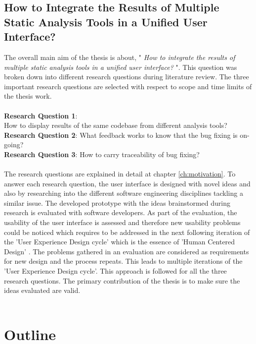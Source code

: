 \subsection{How to Integrate the Results of Multiple Static Analysis Tools in a Unified User Interface?}

The overall main aim of the thesis is about, " \textit{How to integrate the results of multiple static analysis tools in a unified user interface?} ". This question was broken down into different research questions during literature review. The three important research questions are selected with respect to scope and time limits of the thesis work. \\ \\

\noindent\textbf{Research Question 1}: \\ How to display results of the same codebase from different analysis tools? \\
\textbf{Research Question 2}: What feedback works to know that the bug fixing is on-going? \\
\textbf{Research Question 3}: How to carry traceability of bug fixing? \\ \\

The research questions are explained in detail at chapter \ref{ch:motivation}. To answer each research question, the user interface is designed with novel ideas and also by researching into  the different software engineering disciplines tackling a similar issue. The developed prototype with the ideas brainstormed during research is evaluated with software developers. As part of the evaluation, the usability  \cite{usability} of the user interface is assessed and therefore new usability problems could be noticed which requires to be addressed in the next following iteration of the 'User Experience Design cycle' \cite{UXD} which is the essence of 'Human Centered Design' \cite{hcd}. The problems gathered in an evaluation are considered as requirements for new design and the process repeats. This leads to multiple iterations of the 'User Experience Design cycle'. This approach is followed for all the three research questions. The primary contribution of the thesis is to make sure the ideas evaluated are valid. \\ \\

\section{Outline}

